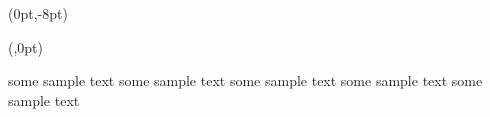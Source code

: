 \documentclass{article}
\begin{document}
  \NewCoffin \result
  \NewCoffin \aaa
  \NewCoffin \bbb
  \NewCoffin \ccc
  \NewCoffin \ddd

\SetHorizontalCoffin \result {}

\SetHorizontalCoffin {}
\SetHorizontalCoffin {}
\SetHorizontalCoffin \ccc  {\color{red}\rule{1.5cm}{3cm}}
\SetHorizontalCoffin {}

\JoinCoffins \result \aaa

\JoinCoffins {}  \bbb [t,r](0pt,-8pt)

\JoinCoffins \result [vc,l]  \ccc [vc,r](\textwidth,0pt)

\JoinCoffins {} \ddd [b,hc]

\noindent\TypesetCoffin \result

some sample text some sample text some sample text some sample text some sample text
\end{document}
